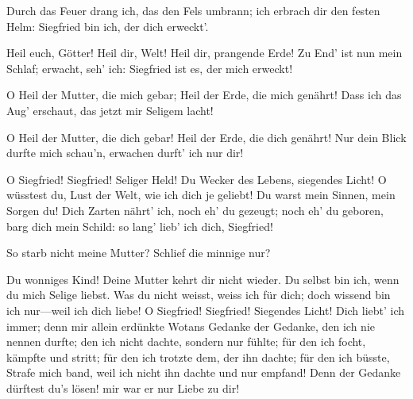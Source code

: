 \begin{drama}
\Siegfriedspeaks


Durch das Feuer drang ich,
das den Fels umbrann;
ich erbrach dir den festen Helm:
Siegfried bin ich,
der dich erweckt'.

\Brunnhildespeaks


Heil euch, Götter!
Heil dir, Welt!
Heil dir, prangende Erde!
Zu End' ist nun mein Schlaf;
erwacht, seh' ich:
Siegfried ist es,
der mich erweckt!

\Siegfriedspeaks


O Heil der Mutter,
die mich gebar;
Heil der Erde,
die mich genährt!
Dass ich das Aug' erschaut,
das jetzt mir Seligem lacht!

\Brunnhildespeaks


O Heil der Mutter,
die dich gebar!
Heil der Erde,
die dich genährt!
Nur dein Blick durfte mich schau'n,
erwachen durft' ich nur dir!


O Siegfried! Siegfried!
Seliger Held!
Du Wecker des Lebens,
siegendes Licht!
O wüsstest du, Lust der Welt,
wie ich dich je geliebt!
Du warst mein Sinnen,
mein Sorgen du!
Dich Zarten nährt' ich,
noch eh' du gezeugt;
noch eh' du geboren,
barg dich mein Schild:
so lang' lieb' ich dich, Siegfried!

\Siegfriedspeaks


So starb nicht meine Mutter?
Schlief die minnige nur?

\Brunnhildespeaks


Du wonniges Kind!
Deine Mutter kehrt dir nicht wieder.
Du selbst bin ich,
wenn du mich Selige liebst.
Was du nicht weisst,
weiss ich für dich;
doch wissend bin ich
nur---weil ich dich liebe!
O Siegfried! Siegfried!
Siegendes Licht!
Dich liebt' ich immer;
denn mir allein
erdünkte Wotans Gedanke
der Gedanke, den ich nie
nennen durfte;
den ich nicht dachte,
sondern nur fühlte;
für den ich focht,
kämpfte und stritt;
für den ich trotzte
dem, der ihn dachte;
für den ich büsste,
Strafe mich band,
weil ich nicht ihn dachte
und nur empfand!
Denn der Gedanke
dürftest du's lösen!
mir war er nur Liebe zu dir!


\end{drama}
